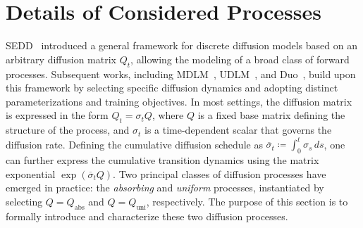 \section{Details of Considered Processes}
\label{app:details of considered processes}
    SEDD~\citep{lou2024discrete} introduced a general framework for discrete diffusion models based on an arbitrary diffusion matrix $Q_t$, allowing the modeling of a broad class of forward processes. 
    Subsequent works, including MDLM~\citep{sahoo2024simple}, UDLM~\citep{schiff2024discreteguidance}, and Duo~\citep{sahoo2025the}, build upon this framework by selecting specific diffusion dynamics and adopting distinct parameterizations and training objectives.
    In most settings, the diffusion matrix is expressed in the form $Q_t = \sigma_t Q$, where $Q$ is a fixed base matrix defining the structure of the process, and $\sigma_t$ is a time-dependent scalar that governs the diffusion rate. Defining the cumulative diffusion schedule as $\overline{\sigma}_t \coloneqq \int_{0}^t \sigma_s \, ds$, one can further express the cumulative transition dynamics using the matrix exponential $\exp(\overline{\sigma}_t Q)$. Two principal classes of diffusion processes have emerged in practice: the \textit{absorbing} and \textit{uniform} processes, instantiated by selecting $Q = Q_{\text{abs}}$ and $Q = Q_{\text{uni}}$, respectively. The purpose of this section is to formally introduce and characterize these two diffusion processes.
